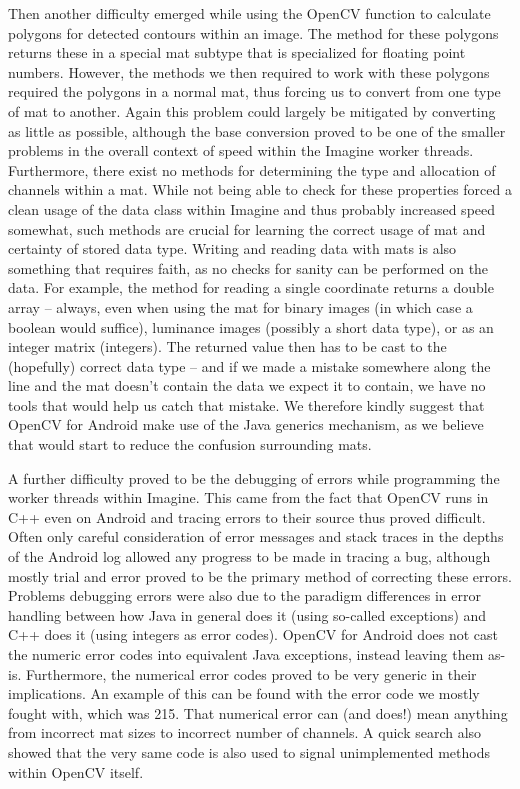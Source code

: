 Then another difficulty emerged while using the OpenCV function to calculate polygons for detected contours within an image.
The method for these polygons returns these in a special mat subtype that is specialized for floating point numbers.
However, the methods we then required to work with these polygons required the polygons in a normal mat, thus forcing us to convert from one type of mat to another.
Again this problem could largely be mitigated by converting as little as possible, although the base conversion proved to be one of the smaller problems in the overall context of speed within the Imagine worker threads.
Furthermore, there exist no methods for determining the type and allocation of channels within a mat.
While not being able to check for these properties forced a clean usage of the data class within Imagine and thus probably increased speed somewhat, such methods are crucial for learning the correct usage of mat and certainty of stored data type.
Writing and reading data with mats is also something that requires faith, as no checks for sanity can be performed on the data.
For example, the method for reading a single coordinate returns a double array – always, even when using the mat for binary images (in which case a boolean would suffice), luminance images (possibly a short data type), or as an integer matrix (integers).
The returned value then has to be cast to the (hopefully) correct data type – and if we made a mistake somewhere along the line and the mat doesn't contain the data we expect it to contain, we have no tools that would help us catch that mistake.
We therefore kindly suggest that OpenCV for Android make use of the Java generics mechanism, as we believe that would start to reduce the confusion surrounding mats.

A further difficulty proved to be the debugging of errors while programming the worker threads within Imagine.
This came from the fact that OpenCV runs in C++ even on Android and tracing errors to their source thus proved difficult.
Often only careful consideration of error messages and stack traces in the depths of the Android log allowed any progress to be made in tracing a bug, although mostly trial and error proved to be the primary method of correcting these errors.
Problems debugging errors were also due to the paradigm differences in error handling between how Java in general does it (using so-called exceptions) and C++ does it (using integers as error codes).
OpenCV for Android does not cast the numeric error codes into equivalent Java exceptions, instead leaving them as-is.
Furthermore, the numerical error codes proved to be very generic in their implications.
An example of this can be found with the error code we mostly fought with, which was 215.
That numerical error can (and does!) mean anything from incorrect mat sizes to incorrect number of channels.
A quick search also showed that the very same code is also used to signal unimplemented methods within OpenCV itself.

